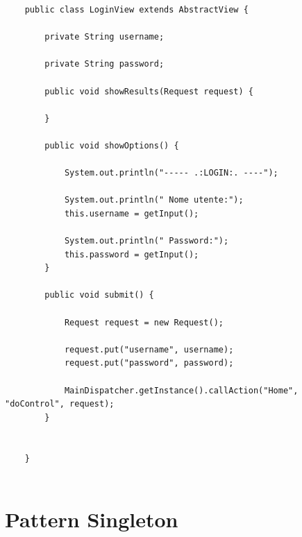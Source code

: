 \documentclass[a4paper,12 pt]{article}
\begin{document}
	\begin{lstlisting}
	public class LoginView extends AbstractView {
	
		private String username;
		
		private String password;
		
		public void showResults(Request request) {
		
		}

		public void showOptions() {
		
			System.out.println("----- .:LOGIN:. ----");
			
			System.out.println(" Nome utente:");
			this.username = getInput();
			
			System.out.println(" Password:");
			this.password = getInput();
		}
		
		public void submit() {
			
			Request request = new Request();
			
			request.put("username", username);
			request.put("password", password);
			
			MainDispatcher.getInstance().callAction("Home", "doControl", request);
		}
	
	
	}
	
	\end{lstlisting}
	
	\section{Pattern Singleton}
	
	
\end{document}
